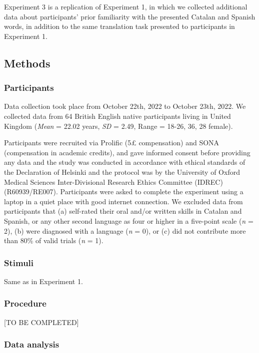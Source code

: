 \documentclass[
]{article}
\begin{document}
Experiment 3 is a replication of Experiment 1, in which we collected
additional data about participants' prior familiarity with the presented
Catalan and Spanish words, in addition to the same translation task
presented to participants in Experiment 1.

\subsection{Methods}\label{methods-2}

\subsubsection{Participants}\label{participants-2}

Data collection took place from October 22th, 2022 to October 23th,
2022. We collected data from 64 British English native participants
living in United Kingdom (\emph{Mean} = 22.02 years, \emph{SD} = 2.49,
Range = 18-26, 36, 28 female).

Participants were recruited via Prolific (5£ compensation) and SONA
(compensation in academic credits), and gave informed consent before
providing any data and the study was conducted in accordance with
ethical standards of the Declaration of Helsinki and the protocol was by
the University of Oxford Medical Sciences Inter-Divisional Research
Ethics Committee (IDREC) (R60939/RE007). Participants were asked to
complete the experiment using a laptop in a quiet place with good
internet connection. We excluded data from participants that (a)
self-rated their oral and/or written skills in Catalan and Spanish, or
any other second language as four or higher in a five-point scale
(\emph{n} = 2), (b) were diagnosed with a language (\emph{n} = 0), or
(c) did not contribute more than 80\% of valid trials (\emph{n} = 1).

\subsubsection{Stimuli}\label{stimuli-2}

Same as in Experiment 1.

\subsubsection{Procedure}\label{procedure-2}

{[}TO BE COMPLETED{]}

\subsubsection{Data analysis}\label{data-analysis-2}
\end{document}
